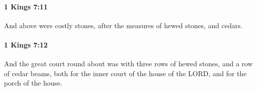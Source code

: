 		\paragraph{1 Kings 7:11} %
			\label{1KINGS-7-11}

			And above were costly stones, after the measures of hewed stones, and cedars.


		\paragraph{1 Kings 7:12} %
			\label{1KINGS-7-12}

			And the great court round about was with three rows of hewed stones, and a row of cedar beams, both for the inner court of the house of the LORD, and for the porch of the house.


